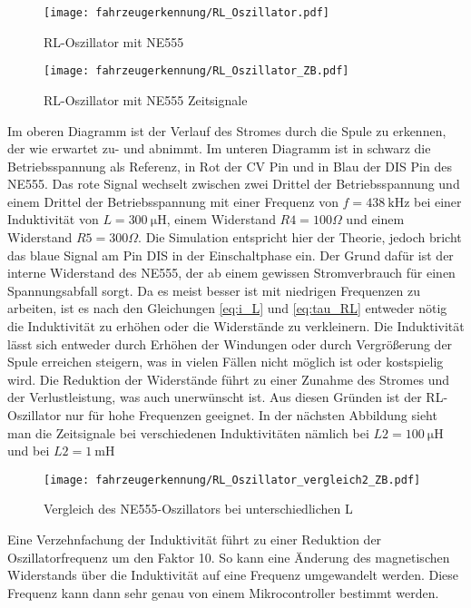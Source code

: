 \begin{figure}[H]
    \centering
    \texttt{[image: fahrzeugerkennung/RL\_Oszillator.pdf]}
    \caption{RL-Oszillator mit NE555}
\end{figure}

\begin{figure}[H]
    \centering
    \texttt{[image: fahrzeugerkennung/RL\_Oszillator\_ZB.pdf]}
    \caption{RL-Oszillator mit NE555 Zeitsignale}
\end{figure}

Im oberen Diagramm ist der Verlauf des Stromes durch die Spule zu erkennen, der wie erwartet zu- und abnimmt. Im unteren Diagramm ist in 
schwarz die Betriebsspannung als Referenz, in Rot der CV Pin und in Blau der DIS Pin des NE555. Das rote Signal wechselt zwischen zwei Drittel der Betriebsspannung 
und einem Drittel der Betriebsspannung mit einer Frequenz von $f = \SI{438}{\kilo\hertz}$ bei einer Induktivität von $L = \SI{300}{\micro\henry}$, einem Widerstand $R4 = 100\Omega$ und einem
Widerstand $R5 = 300\Omega$. Die Simulation entspricht hier der Theorie, jedoch bricht das blaue Signal am Pin DIS in der Einschaltphase ein.
Der Grund dafür ist der interne Widerstand des NE555, der ab einem gewissen Stromverbrauch für einen Spannungsabfall sorgt. Da es meist besser ist mit
niedrigen Frequenzen zu arbeiten, ist es nach den Gleichungen \ref{eq:i_L} und \ref{eq:tau_RL} entweder nötig die Induktivität zu erhöhen oder die Widerstände zu verkleinern.
Die Induktivität lässt sich entweder durch Erhöhen der Windungen oder durch Vergrößerung der Spule erreichen steigern, was in vielen Fällen nicht möglich ist oder kostspielig wird.
Die Reduktion der Widerstände führt zu einer Zunahme des Stromes und der Verlustleistung, was auch unerwünscht ist.
Aus diesen Gründen ist der RL-Oszillator nur für hohe Frequenzen geeignet. In der nächsten Abbildung sieht man die Zeitsignale bei verschiedenen Induktivitäten
nämlich bei $L2 = \SI{100}{\micro\henry}$ und bei $L2 = \SI{1}{\milli\henry}$

\begin{figure}[H]
    \centering
    \texttt{[image: fahrzeugerkennung/RL\_Oszillator\_vergleich2\_ZB.pdf]}
    \caption{Vergleich des NE555-Oszillators bei unterschiedlichen L}
\end{figure}

Eine Verzehnfachung der Induktivität führt zu einer Reduktion der Oszillatorfrequenz um den Faktor 10.
So kann eine Änderung des magnetischen Widerstands über die Induktivität auf eine Frequenz umgewandelt werden. Diese Frequenz kann dann sehr genau von einem
Mikrocontroller bestimmt werden. 

